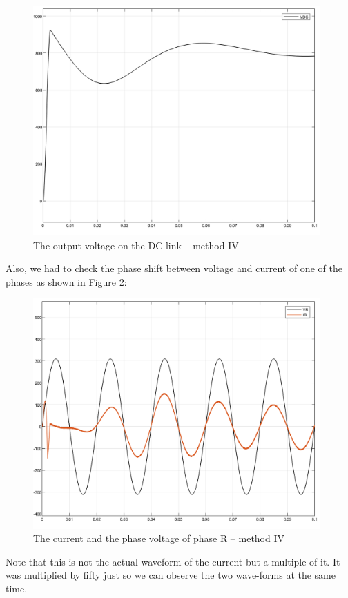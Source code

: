 \documentclass[12pt,a4paper]{book}
\begin{document}
\begin{figure}[h!]
  \centering
  \includegraphics[width=11cm]{image26.png}
  \caption{The output voltage on the DC-link -- method IV}
  \label{fig:image26}
\end{figure}
Also, we had to check the phase shift between voltage and current of one of the phases as shown in Figure \ref{fig:image27}:

\begin{figure}[h!]
  \centering
  \includegraphics[width=11cm]{image27.png}
  \caption{The current and the phase voltage of phase R -- method IV}
  \label{fig:image27}
\end{figure}
Note that this is not the actual waveform of the current but a multiple of it. It was multiplied by fifty just so we can observe the two wave-forms at the same time.
\end{document}
